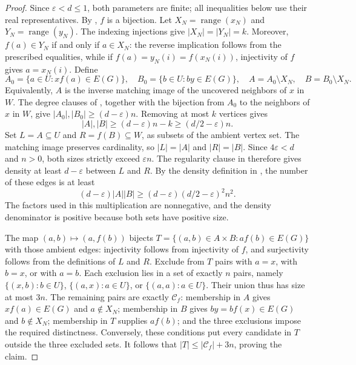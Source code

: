 \begin{proof}
Since $\varepsilon<d\leq1$, both parameters are finite; all inequalities
below use their real representatives.
By , $f$ is a bijection. Let
$X_N=\operatorname{range}(x_N)$ and $Y_N=\operatorname{range}(y_N)$.
The indexing injections give $|X_N|=|Y_N|=k$.
Moreover, $f(a)\in Y_N$ if and only if $a\in X_N$: the reverse implication
follows from the prescribed equalities, while if $f(a)=y_N(i)=f(x_N(i))$,
injectivity of $f$ gives $a=x_N(i)$.
Define
\[
 A_0=\{a\in U:xf(a)\in E(G)\},\quad
 B_0=\{b\in U:by\in E(G)\},\quad
 A=A_0\setminus X_N,\quad B=B_0\setminus X_N.
\]
Equivalently, $A$ is the inverse matching image of the uncovered neighbors
of $x$ in $W$. The degree clauses of , together
with the bijection from $A_0$ to the neighbors of $x$ in $W$, give
$|A_0|,|B_0|\geq(d-\varepsilon)n$. Removing at most $k$ vertices gives
\[
 |A|,|B|\geq(d-\varepsilon)n-k\geq(d/2-\varepsilon)n.
\]
Set $L=A\subseteq U$ and $R=f(B)\subseteq W$, as subsets of the ambient
vertex set. The matching image preserves cardinality, so
$|L|=|A|$ and $|R|=|B|$. Since $4\varepsilon<d$ and $n>0$, both sizes
strictly exceed $\varepsilon n$. The regularity clause in
 therefore gives density at least $d-\varepsilon$
between $L$ and $R$. By the density definition in ,
the number of these edges is at least
\[
 (d-\varepsilon)|A||B|
 \geq(d-\varepsilon)(d/2-\varepsilon)^2 n^2.
\]
The factors used in this multiplication are nonnegative, and the density
denominator is positive because both sets have positive size.

The map $(a,b)\mapsto(a,f(b))$ bijects
$T=\{(a,b)\in A\times B:af(b)\in E(G)\}$ with those ambient edges:
injectivity follows from injectivity of $f$, and surjectivity follows from
the definitions of $L$ and $R$. Exclude from $T$ pairs with $a=x$, with
$b=x$, or with $a=b$. Each exclusion lies in a set of exactly $n$ pairs,
namely $\{(x,b):b\in U\}$, $\{(a,x):a\in U\}$, or
$\{(a,a):a\in U\}$. Their union thus has size at most $3n$.
The remaining pairs are exactly $\mathcal C_f$: membership in $A$ gives
$xf(a)\in E(G)$ and $a\notin X_N$; membership in $B$ gives
$by=bf(x)\in E(G)$ and $b\notin X_N$; membership in $T$ supplies $af(b)$;
and the three exclusions impose the required distinctness. Conversely,
these conditions put every candidate in $T$ outside the three excluded sets.
It follows that $|T|\leq|\mathcal C_f|+3n$, proving the claim.
\end{proof}
